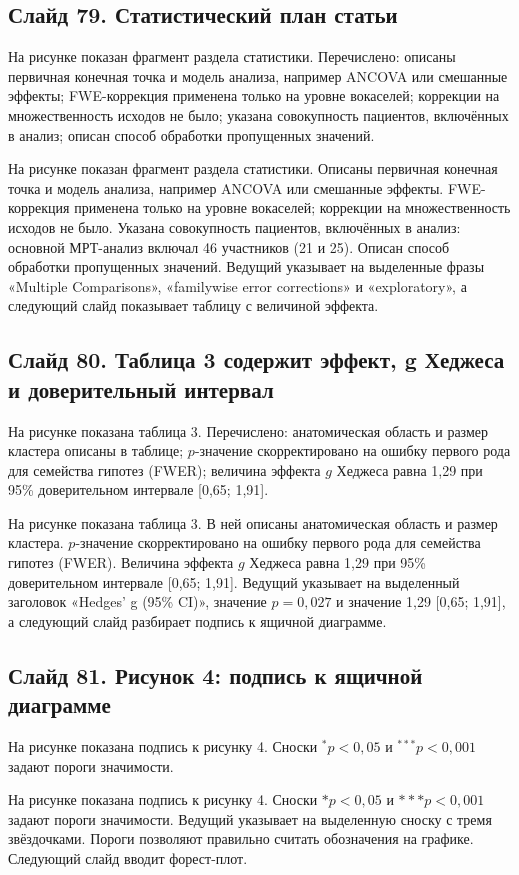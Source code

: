 \documentclass[11pt,a4paper]{article}
\begin{document}
\subsection*{Слайд 79. Статистический план статьи}
\begin{onslide}
На рисунке показан фрагмент раздела статистики. Перечислено: описаны первичная конечная точка и модель анализа, например ANCOVA или смешанные эффекты; FWE-коррекция применена только на уровне вокаселей; коррекции на множественность исходов не было; указана совокупность пациентов, включённых в анализ; описан способ обработки пропущенных значений.
\end{onslide}
На рисунке показан фрагмент раздела статистики. Описаны первичная конечная точка и модель анализа, например ANCOVA или смешанные эффекты. FWE-коррекция применена только на уровне вокаселей; коррекции на множественность исходов не было. Указана совокупность пациентов, включённых в анализ: основной МРТ-анализ включал 46 участников (21 и 25). Описан способ обработки пропущенных значений. Ведущий указывает на выделенные фразы «Multiple Comparisons», «familywise error corrections» и «exploratory», а следующий слайд показывает таблицу с величиной эффекта.

\subsection*{Слайд 80. Таблица 3 содержит эффект, g Хеджеса и доверительный интервал}
\begin{onslide}
На рисунке показана таблица 3. Перечислено: анатомическая область и размер кластера описаны в таблице; $p$-значение скорректировано на ошибку первого рода для семейства гипотез (FWER); величина эффекта $g$ Хеджеса равна 1,29 при 95\% доверительном интервале [0,65; 1,91].
\end{onslide}
На рисунке показана таблица 3. В ней описаны анатомическая область и размер кластера. $p$-значение скорректировано на ошибку первого рода для семейства гипотез (FWER). Величина эффекта $g$ Хеджеса равна 1,29 при 95\% доверительном интервале [0,65; 1,91]. Ведущий указывает на выделенный заголовок «Hedges' g (95\% CI)», значение $p = 0{,}027$ и значение 1,29 [0,65; 1,91], а следующий слайд разбирает подпись к ящичной диаграмме.

\subsection*{Слайд 81. Рисунок 4: подпись к ящичной диаграмме}
\begin{onslide}
На рисунке показана подпись к рисунку 4. Сноски $^*p < 0{,}05$ и $^{***}p < 0{,}001$ задают пороги значимости.
\end{onslide}
На рисунке показана подпись к рисунку 4. Сноски $*p < 0{,}05$ и $***p < 0{,}001$ задают пороги значимости. Ведущий указывает на выделенную сноску с тремя звёздочками. Пороги позволяют правильно считать обозначения на графике. Следующий слайд вводит форест-плот.
\end{document}
